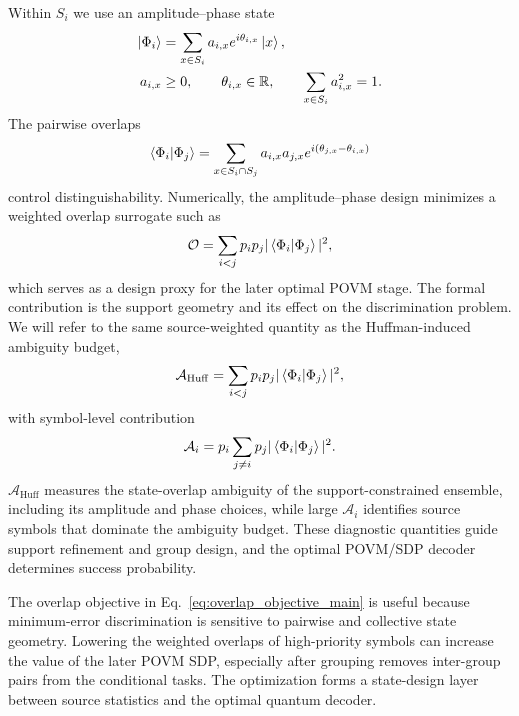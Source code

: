 \documentclass[
 reprint,
 amsmath,amssymb,
 aps,
 pra,
 floatfix,
]{revtex4-2}
\begin{document}
Within $S_i$ we use an amplitude--phase state
\begin{equation}
    \begin{aligned}
    \ket{\Phi_i}&=\sum_{x\in S_i} a_{i,x}e^{i\theta_{i,x}}\ket{x},\\
    a_{i,x}&\geq0,\qquad \theta_{i,x}\in\mathbb R,\qquad
    \sum_{x\in S_i}a_{i,x}^2=1 .
    \end{aligned}
    \label{eq:phi_state_main}
\end{equation}
The pairwise overlaps
\begin{equation}
    \braket{\Phi_i|\Phi_j}=\sum_{x\in S_i\cap S_j}a_{i,x}a_{j,x}e^{i(\theta_{j,x}-\theta_{i,x})}
    \label{eq:pairwise_overlap_main}
\end{equation}
control distinguishability. Numerically, the amplitude--phase design minimizes a weighted overlap surrogate such as
\begin{equation}
    \mathcal O=\sum_{i<j}p_ip_j|\braket{\Phi_i|\Phi_j}|^2,
    \label{eq:overlap_objective_main}
\end{equation}
which serves as a design proxy for the later optimal POVM stage. The formal contribution is the support geometry and its effect on the discrimination problem.
We will refer to the same source-weighted quantity as the Huffman-induced ambiguity budget,
\begin{equation}
    \mathcal A_{\mathrm{Huff}}
    =
    \sum_{i<j}p_ip_j|\braket{\Phi_i|\Phi_j}|^2,
    \label{eq:huffman_ambiguity_budget}
\end{equation}
with symbol-level contribution
\begin{equation}
    \mathcal A_i
    =
    p_i\sum_{j\neq i}p_j|\braket{\Phi_i|\Phi_j}|^2 .
    \label{eq:symbol_ambiguity_contribution}
\end{equation}
\(\mathcal A_{\mathrm{Huff}}\) measures the state-overlap ambiguity of the support-constrained ensemble, including its amplitude and phase choices, while large \(\mathcal A_i\) identifies source symbols that dominate the ambiguity budget. These diagnostic quantities guide support refinement and group design, and the optimal POVM/SDP decoder determines success probability.

The overlap objective in Eq.~\eqref{eq:overlap_objective_main} is useful because minimum-error discrimination is sensitive to pairwise and collective state geometry. Lowering the weighted overlaps of high-priority symbols can increase the value of the later POVM SDP, especially after grouping removes inter-group pairs from the conditional tasks. The optimization forms a state-design layer between source statistics and the optimal quantum decoder.
\end{document}
